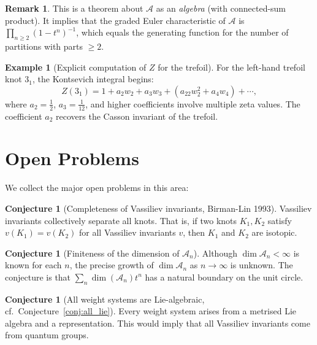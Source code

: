 \documentclass[12pt,a4paper]{amsart}
\theoremstyle{definition}
\newtheorem{example}[theorem]{Example}
\newtheorem{remark}[theorem]{Remark}
\newtheorem{conjecture}[theorem]{Conjecture}
\begin{document}
\begin{remark}
This is a theorem about $\mathcal{A}$ as an \emph{algebra} (with connected-sum
product).  It implies that the graded Euler characteristic of $\mathcal{A}$
is $\prod_{n \geq 2} (1 - t^n)^{-1}$, which equals the generating function
for the number of partitions with parts $\geq 2$.
\end{remark}

\begin{example}[Explicit computation of $Z$ for the trefoil]
For the left-hand trefoil knot $3_1$, the Kontsevich integral begins:
\[
  Z(3_1) = 1 + a_2 w_2 + a_3 w_3 + (a_{22} w_2^2 + a_4 w_4) + \cdots,
\]
where $a_2 = \frac{1}{2}$, $a_3 = \frac{1}{12}$, and higher coefficients
involve multiple zeta values.  The coefficient $a_2$ recovers the Casson
invariant of the trefoil.
\end{example}

\section{Open Problems}\label{sec:open}

We collect the major open problems in this area:

\begin{conjecture}[Completeness of Vassiliev invariants, Birman-Lin 1993]
\label{conj:complete2}
Vassiliev invariants collectively separate all knots.  That is, if two
knots $K_1, K_2$ satisfy $v(K_1) = v(K_2)$ for all Vassiliev invariants
$v$, then $K_1$ and $K_2$ are isotopic.
\end{conjecture}

\begin{conjecture}[Finiteness of the dimension of $\mathcal{A}_n$]
\label{conj:finiteness}
Although $\dim \mathcal{A}_n < \infty$ is known for each $n$, the precise
growth of $\dim \mathcal{A}_n$ as $n \to \infty$ is unknown.  The conjecture
is that $\sum_n \dim(\mathcal{A}_n) t^n$ has a natural boundary on the unit
circle.
\end{conjecture}

\begin{conjecture}[All weight systems are Lie-algebraic, cf.\ Conjecture~\ref{conj:all_lie}]
Every weight system arises from a metrised Lie algebra and a representation.
This would imply that all Vassiliev invariants come from quantum groups.
\end{conjecture}
\end{document}
